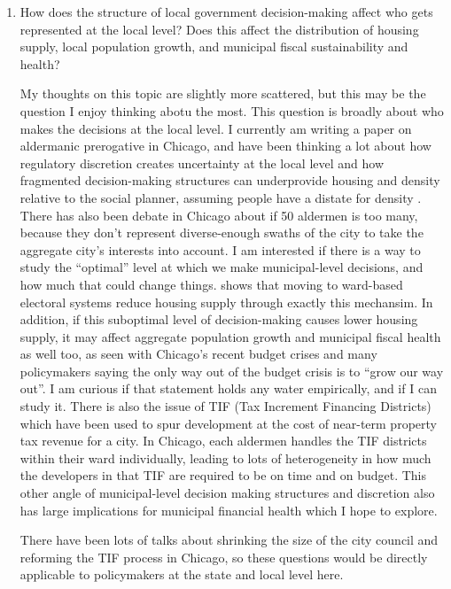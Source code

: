 \documentclass{article}
\begin{document}
\begin{enumerate}
    \item How does the structure of local government decision-making affect who gets represented at the local level? Does this affect the distribution of housing supply, 
    local population growth, and municipal fiscal sustainability and health? 

    My thoughts on this topic are slightly more scattered, but this may be the question I enjoy thinking abotu the most. 
    This question is broadly about who makes the decisions at the local level. 
    I currently am writing a paper on aldermanic prerogative in Chicago, and have been thinking a lot about how regulatory discretion creates uncertainty at 
    the local level and how fragmented decision-making structures can underprovide housing and density relative to the social planner, assuming people 
    have a distate for density \cite{gyourko_distaste_2024}. There has also been debate in Chicago about if 50 aldermen is too many, 
    because they don't represent diverse-enough swaths of the city to take the aggregate city's interests into account.
    I am interested if there is a way to study the ``optimal'' level at which we make municipal-level decisions, and how much that could change things. 
    \cite{mast_warding_2024} shows that moving to ward-based electoral systems reduce housing supply through exactly this mechansim. 
    In addition, if this suboptimal level of decision-making causes lower housing supply, it may affect aggregate population growth and municipal fiscal health as well too, 
    as seen with Chicago's recent budget crises and many policymakers saying the only way out of the budget crisis is to ``grow our way out''. I am curious if that statement holds any water empirically, and if I can study it. 
    There is also the issue of TIF (Tax Increment Financing Districts) which have been used to spur development at the cost of near-term property tax revenue for a city. 
    In Chicago, each aldermen handles the TIF districts within their ward individually, leading to lots of heterogeneity in how much the developers in that TIF are required to be on time and on budget. 
    This other angle of municipal-level decision making structures and discretion also has large implications for municipal financial health which I hope to explore. 

    There have been lots of talks about shrinking the size of the city council and reforming the TIF process in Chicago, so these questions would be directly applicable to policymakers at the state and local level here. 

\end{enumerate}
\end{document}
